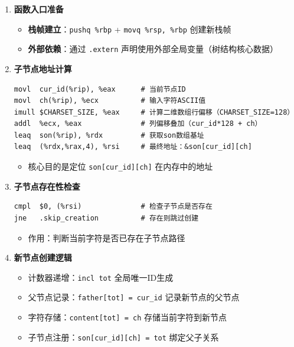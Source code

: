 \documentclass[10pt,a4paper]{article}
\begin{document}
\begin{enumerate}
    \item \textbf{函数入口准备}
    \begin{itemize}
        \item \textbf{栈帧建立}：\verb|pushq %rbp| + \verb|movq %rsp, %rbp| 创建新栈帧
        \item \textbf{外部依赖}：通过 \verb|.extern| 声明使用外部全局变量（树结构核心数据）
    \end{itemize}
    
    \item \textbf{子节点地址计算}
    \begin{lstlisting}[language={[x86masm]Assembler}]
movl  cur_id(%rip), %eax      # 当前节点ID
movl  ch(%rip), %ecx          # 输入字符ASCII值
imull $CHARSET_SIZE, %eax     # 计算二维数组行偏移（CHARSET_SIZE=128）
addl  %ecx, %eax              # 列偏移叠加（cur_id*128 + ch）
leaq  son(%rip), %rdx         # 获取son数组基址
leaq  (%rdx,%rax,4), %rsi     # 最终地址：&son[cur_id][ch]
    \end{lstlisting}
    \begin{itemize}
        \item 核心目的是定位 \verb|son[cur_id][ch]| 在内存中的地址
    \end{itemize}
    
    \item \textbf{子节点存在性检查}
    \begin{lstlisting}[language={[x86masm]Assembler}]
cmpl  $0, (%rsi)              # 检查子节点是否存在
jne   .skip_creation          # 存在则跳过创建
    \end{lstlisting}
    \begin{itemize}
        \item 作用：判断当前字符是否已存在子节点路径
    \end{itemize}
    
    \item \textbf{新节点创建逻辑}
    \begin{itemize}
        \item 计数器递增：\verb|incl tot| 全局唯一ID生成
        \item 父节点记录：\verb|father[tot] = cur_id| 记录新节点的父节点
        \item 字符存储：\verb|content[tot] = ch| 存储当前字符到新节点
        \item 子节点注册：\verb|son[cur_id][ch] = tot| 绑定父子关系
    \end{itemize}
    

\end{enumerate}
\end{document}
